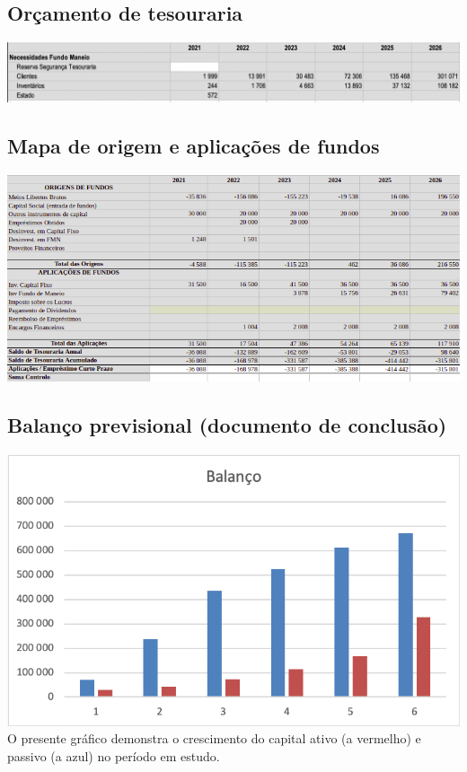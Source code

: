 \documentclass[a4paper]{article}
\begin{document}
\subsection{Orçamento de tesouraria}
\begin{center}
    \includegraphics[scale=0.45]{images/tesouraria.png}
\end{center}

\subsection{Mapa de origem e aplicações de fundos}
\begin{center}
    \includegraphics[scale=0.5]{images/planofinanciamento.png}
\end{center}

\subsection{Balanço previsional (documento de conclusão)}
\includegraphics[scale=0.8]{images/balanço.png}\linebreak
O presente gráfico demonstra o crescimento do capital ativo (a vermelho) e passivo (a azul) no período em estudo.
\end{document}
